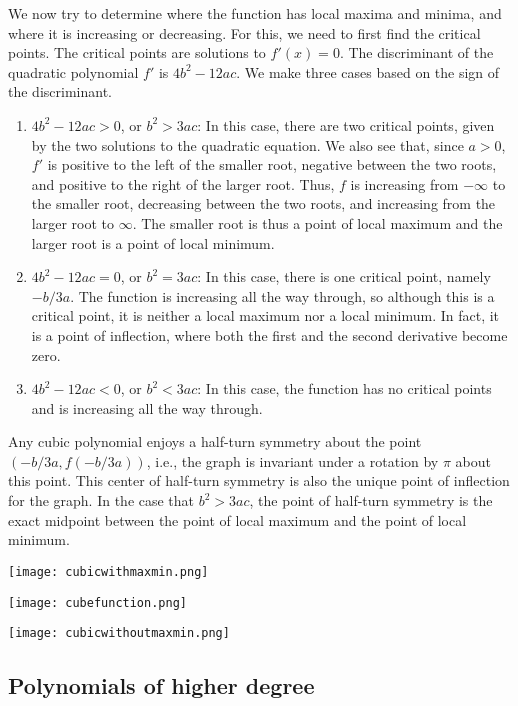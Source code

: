 \documentclass[10pt]{amsart}
\begin{document}
We now try to determine where the function has local maxima and
minima, and where it is increasing or decreasing. For this, we need to
first find the critical points. The critical points are solutions to
$f'(x) = 0$. The discriminant of the quadratic polynomial $f'$ is
$4b^2 - 12ac$. We make three cases based on the sign of the
discriminant.

\begin{enumerate}
\item $4b^2 - 12ac > 0$, or $b^2 > 3ac$: In this case, there are two
  critical points, given by the two solutions to the quadratic
  equation. We also see that, since $a > 0$, $f'$ is positive to the
  left of the smaller root, negative between the two roots, and
  positive to the right of the larger root. Thus, $f$ is increasing
  from $-\infty$ to the smaller root, decreasing between the two
  roots, and increasing from the larger root to $\infty$. The smaller
  root is thus a point of local maximum and the larger root is a point
  of local minimum.
\item $4b^2 - 12ac = 0$, or $b^2 = 3ac$: In this case, there is one
  critical point, namely $-b/3a$. The function is increasing all the
  way through, so although this is a critical point, it is neither a
  local maximum nor a local minimum. In fact, it is a point of
  inflection, where both the first and the second derivative become
  zero.
\item $4b^2 - 12ac<0$, or $b^2 < 3ac$: In this case, the function has
  no critical points and is increasing all the way through.
\end{enumerate}

Any cubic polynomial enjoys a half-turn symmetry about the point
$(-b/3a,f(-b/3a))$, i.e., the graph is invariant under a rotation by
$\pi$ about this point. This center of half-turn symmetry is also the
unique point of inflection for the graph. In the case that $b^2 >
3ac$, the point of half-turn symmetry is the exact midpoint between
the point of local maximum and the point of local minimum.

\texttt{[image: cubicwithmaxmin.png]}

\texttt{[image: cubefunction.png]}

\texttt{[image: cubicwithoutmaxmin.png]}

\subsection{Polynomials of higher degree}
\end{document}

